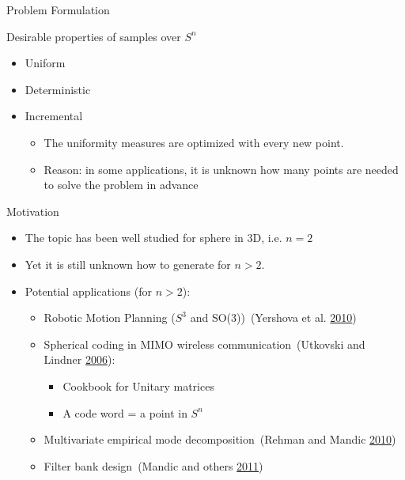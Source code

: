 \documentclass[10pt,ignorenonframetext,serif,onlymath]{beamer}
\begin{document}
\begin{frame}{Problem Formulation}
\protect\hypertarget{problem-formulation}{}

Desirable properties of samples over \(S^n\)

\begin{itemize}
\item
  Uniform
\item
  Deterministic
\item
  Incremental

  \begin{itemize}
  \item
    The uniformity measures are optimized with every new point.
  \item
    Reason: in some applications, it is unknown how many points are
    needed to solve the problem in advance
  \end{itemize}
\end{itemize}

\end{frame}

\begin{frame}{Motivation}
\protect\hypertarget{motivation}{}

\begin{itemize}
\item
  The topic has been well studied for sphere in 3D, i.e. \(n=2\)
\item
  Yet it is still unknown how to generate for \(n > 2\).
\item
  Potential applications (for \(n > 2\)):

  \begin{itemize}
  \item
    Robotic Motion Planning (\(S^3\) and SO(3))~(Yershova et al.
    \protect\hyperlink{ref-yershova2010generating}{2010})
  \item
    Spherical coding in MIMO wireless communication~(Utkovski and
    Lindner \protect\hyperlink{ref-utkovski2006construction}{2006}):

    \begin{itemize}
    \item
      Cookbook for Unitary matrices
    \item
      A code word = a point in \(S^n\)
    \end{itemize}
  \item
    Multivariate empirical mode decomposition~(Rehman and Mandic
    \protect\hyperlink{ref-rehman2010multivariate}{2010})
  \item
    Filter bank design~(Mandic and others
    \protect\hyperlink{ref-mandic2011filter}{2011})
  \end{itemize}
\end{itemize}

\end{frame}
\end{document}

